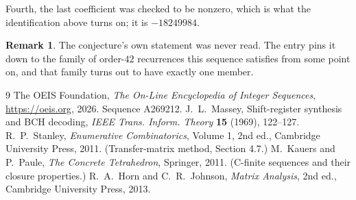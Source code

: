 \documentclass[11pt,a4paper]{article}
\theoremstyle{plain}
\theoremstyle{definition}
\newtheorem{remark}[theorem]{Remark}
\begin{document}
Fourth, the last coefficient was checked to be nonzero, which is what the identification above
turns on; it is $-18249984$.

\begin{remark}
The conjecture's own statement was never read. The entry pins it down to the family of
order-$42$ recurrences this sequence satisfies from some point on, and that family turns
out to have exactly one member.
\end{remark}

\begin{thebibliography}{9}
 The OEIS Foundation, \emph{The On-Line Encyclopedia of Integer
Sequences}, \url{https://oeis.org}, 2026. Sequence A269212.
 J.~L.~Massey, Shift-register synthesis and BCH decoding, \emph{IEEE
Trans. Inform. Theory} \textbf{15} (1969), 122--127.
 R.~P.~Stanley, \emph{Enumerative Combinatorics}, Volume 1, 2nd ed.,
Cambridge University Press, 2011. (Transfer-matrix method, Section 4.7.)
 M.~Kauers and P.~Paule, \emph{The Concrete Tetrahedron}, Springer, 2011.
(C-finite sequences and their closure properties.)
 R.~A.~Horn and C.~R.~Johnson, \emph{Matrix Analysis}, 2nd ed., Cambridge
University Press, 2013.
\end{thebibliography}
\end{document}
